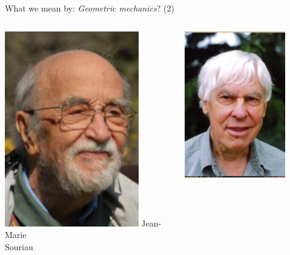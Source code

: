 \documentclass[handout,10pt]{beamer}
\begin{document}
\begin{frame}{What we mean by: \emph{Geometric mechanics}? (2)}
\begin{columns}[T]
\begin{column}{.2\textwidth}
			\includegraphics[width=0.8\textwidth]{Pictures/FFat/souriau} 
			Jean-Marie \\			
			Souriau
		\end{column}
		\begin{column}{.2\textwidth}
			\center
			\includegraphics[width=0.8\textwidth]{Pictures/FFat/smale}

\end{column}
\end{columns}
\end{frame}
\end{document}
